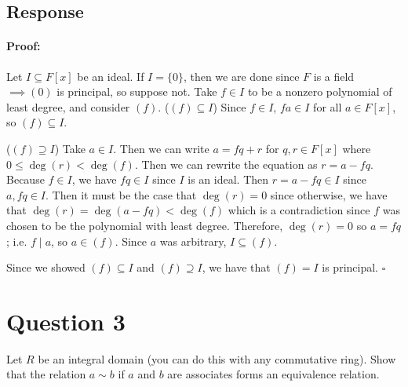 \documentclass [12pt] {article}
\newenvironment{proof}{\paragraph{Proof:}}{\hfill$\square$}
\begin{document}
\subsection*{Response}
\begin{proof}
    Let $I \subseteq F[x]$ be an ideal. If $I = \{ 0 \}$, then we are done since $F$ is a field
    $\implies (0)$ is principal, so suppose not. Take $f \in I$ to be a nonzero polynomial of
    least degree, and consider $(f)$.
    \newline
    ($(f) \subseteq I$)
    Since $f \in I$, $fa \in I$ for all $a \in F[x]$, so $(f) \subseteq I$.
    \vspace{1em}

    ($(f) \supseteq I$)
    Take $a \in I$. Then we can write $a = fq + r$ for $q, r \in F[x]$ where
    $0 \leq \deg(r) < \deg(f)$. Then we can rewrite the equation as $r = a - fq$. Because $f \in I$,
    we have $fq \in I$ since $I$ is an ideal. Then $r = a - fq \in I$ since $a, fq \in I$. Then
    it must be the case that $\deg(r) = 0$ since otherwise, we have that
    $\deg(r) = \deg(a - fq) < \deg(f)$ which is a contradiction since $f$ was chosen to be the
    polynomial with least degree. Therefore, $\deg(r) = 0$ so $a = fq$; i.e. $f \mid a$, so
    $a \in (f)$. Since $a$ was arbitrary, $I \subseteq (f)$.
    \vspace{1em}

    Since we showed $(f) \subseteq I$ and $(f) \supseteq I$, we have that $(f) = I$ is principal.
\end{proof}
\newpage


\section*{Question 3}
Let $R$ be an integral domain (you can do this with any commutative ring). Show that the relation
$a\sim b$ if $a$ and $b$ are associates forms an equivalence relation.
\end{document}
